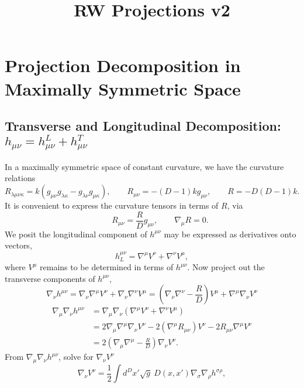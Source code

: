 \documentclass[10pt,letterpaper]{article}
\title{RW Projections v2}
\date{}
\numberwithin{equation}{subsection}
\begin{document}
\maketitle
\tableofcontents
\newpage
\noindent 
\section{Projection Decomposition in Maximally Symmetric Space}
\subsection{Transverse and Longitudinal Decomposition: $h_{\mu\nu} = h^L_{\mu\nu}+h^T_{\mu\nu}$}
In a maximally symmetric space of constant curvature, we have the curvature relations
\begin{equation}
R_{\lambda\mu\nu\kappa} = k(g_{\mu\nu}g_{\lambda\kappa} - g_{\lambda\nu}g_{\mu\kappa}),
\qquad R_{\mu\nu} = -(D-1)k g_{\mu\nu},\qquad  R = -D(D-1)k.
\end{equation}
It is convenient to express the curvature tensors in terms of $R$, via
\begin{equation}
\qquad R_{\mu\nu} = \frac{R}{D}g_{\mu\nu},\qquad \nabla_\mu R = 0.
\end{equation}
We posit the longitudinal component of $h^{\mu\nu}$ may be expressed as derivatives onto vectors,
\begin{equation}
h^{\mu\nu}_L = \nabla^\mu V^\nu  + \nabla^\nu V^\mu,
\end{equation}
where $V^{\mu}$ remains to be determined in terms of $h^{\mu\nu}$.
Now project out the transverse components of $h^{\mu\nu}$,
\begin{equation}
\nabla_\nu h^{\mu\nu} = \nabla_\nu \nabla^\mu V^\nu + \nabla_\nu \nabla^\nu V^\mu
= \left(\nabla_\nu\nabla^\nu - \frac{R}{D}\right)V^\mu + \nabla^\mu \nabla_\nu V^\nu 
\end{equation}
\begin{align}
\nabla_\mu\nabla_\nu h^{\mu\nu} &= \nabla_\mu\nabla_\nu( \nabla^\mu V^\nu + \nabla^\nu V^\mu)
\nonumber\\
& = 
 2 \nabla_\mu \nabla^\mu \nabla_\nu V^\nu - 2(\nabla^\mu R_{\mu\nu})V^\nu - 2 R_{\mu\nu} \nabla^\mu V^\nu
\nonumber\\
&
=  2\left(
\nabla_\mu \nabla^\mu - \frac{R}{D}\right) \nabla_\nu V^\nu.
\end{align}
From $\nabla_\mu\nabla_\nu h^{\mu\nu}$, solve for $\nabla_\nu V^\nu$
\begin{equation}
\nabla_\nu V^\nu = \frac12 \int d^Dx' \sqrt{g}\ D(x,x') \nabla_\sigma\nabla_\rho h^{\sigma\rho},
\end{equation}
\end{document}
